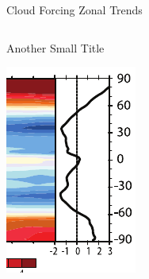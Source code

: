 \documentclass[10pt,t]{beamer}
\begin{document}
\begin{frame}[label={sec:org9a39960}]{Cloud Forcing Zonal Trends}
\begin{columns}
\begin{column}{0.33\columnwidth}
\begin{block}{\footnotesize Another Small Title}
\vspace{-0.1in}
\begin{center}
\includegraphics[width=\linewidth]{./Figs/Pdf/trenberth_total_only.pdf}
\end{center}
\end{block}
\end{column}


\end{columns}
\end{frame}
\end{document}
